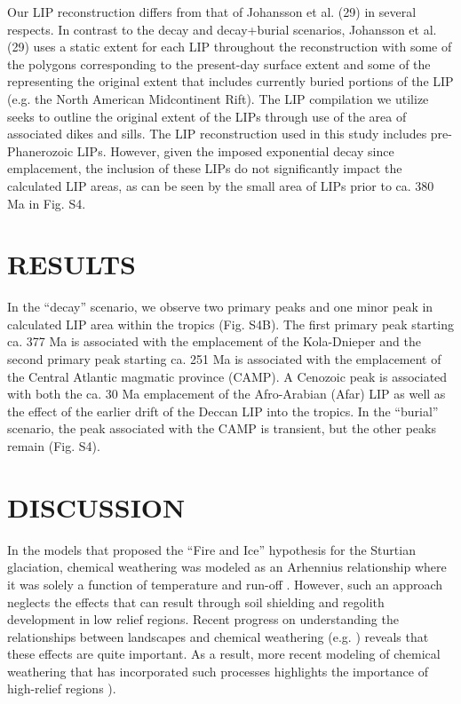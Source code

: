 \documentclass[11pt,letterpaper]{article}
\begin{document}
Our LIP reconstruction differs from that of Johansson et al. (29) in several respects. In contrast to the decay and decay+burial scenarios, Johansson et al. (29) uses a static extent for each LIP throughout the reconstruction with some of the polygons corresponding to the present-day surface extent and some of the representing the original extent that includes currently buried portions of the LIP (e.g. the North American Midcontinent Rift). The LIP compilation we utilize seeks to outline the original extent of the LIPs through use of the area of associated dikes and sills. The LIP reconstruction used in this study includes pre-Phanerozoic LIPs. However, given the imposed exponential decay since emplacement, the inclusion of these LIPs do not significantly impact the calculated LIP areas, as can be seen by the small area of LIPs prior to ca. 380 Ma in Fig. S4.

\section*{RESULTS}

In the “decay” scenario, we observe two primary peaks and one minor peak in calculated LIP area within the tropics (Fig. S4B). The first primary peak starting ca. 377 Ma is associated with the emplacement of the Kola-Dnieper and the second primary peak starting ca. 251 Ma is associated with the emplacement of the Central Atlantic magmatic province (CAMP). A Cenozoic peak is associated with both the ca. 30 Ma emplacement of the Afro-Arabian (Afar) LIP as well as the effect of the earlier drift of the Deccan LIP into the tropics. In the “burial” scenario, the peak associated with the CAMP is transient, but the other peaks remain (Fig. S4).

\section*{DISCUSSION}

In the models that proposed the ``Fire and Ice'' hypothesis for the Sturtian glaciation, chemical weathering was modeled as an Arhennius relationship where it was solely a function of temperature and run-off \citep{Donnadieu2004a}. However, such an approach neglects the effects that can result through soil shielding and regolith development in low relief regions. Recent progress on understanding the relationships between landscapes and chemical weathering (e.g. \cite{Maher2014a}) reveals that these effects are quite important. As a result, more recent modeling of chemical weathering that has incorporated such processes highlights the importance of high-relief regions \citep{Godderis2017b}).
\end{document}
